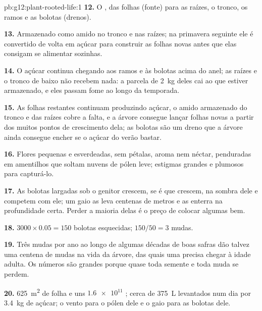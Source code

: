 \begin{solution}{pb:g12:plant-rooted-life:1}
\textbf{12.} O , das folhas (fonte) para as raízes, o tronco, os
ramos e as bolotas (drenos).

\textbf{13.} Armazenado como amido no tronco e nas raízes; na primavera
seguinte ele é convertido de volta em açúcar para construir as folhas
novas antes que elas consigam se alimentar sozinhas.

\textbf{14.} O açúcar continua chegando aos ramos e às bolotas acima do
anel; as raízes e o tronco de baixo não recebem nada: a parcela de
\qty{2}{kg} deles cai ao que estiver armazenado, e eles passam fome ao
longo da temporada.

\textbf{15.} As folhas restantes continuam produzindo açúcar, o amido
armazenado do tronco e das raízes cobre a falta, e a árvore consegue
lançar folhas novas a partir dos muitos pontos de crescimento dela; as
bolotas são um dreno que a árvore ainda consegue encher se o açúcar do
verão bastar.

\textbf{16.} Flores pequenas e esverdeadas, sem pétalas, aroma nem
néctar, penduradas em amentilhos que soltam nuvens de pólen leve;
estigmas grandes e plumosos para capturá-lo.

\textbf{17.} As bolotas largadas sob o genitor crescem, se é que
crescem, na sombra dele e competem com ele; um gaio as leva centenas de
metros e as enterra na profundidade certa. Perder a maioria delas é o
preço de colocar algumas bem.

\textbf{18.} $3000 \times 0.05 = 150$ bolotas esquecidas; $150/50 = 3$
mudas.

\textbf{19.} Três mudas por ano ao longo de algumas décadas de boas
safras dão talvez uma centena de mudas na vida da árvore, das quais uma
precisa chegar à idade adulta. Os números são grandes porque quase toda
semente e toda muda se perdem.

\textbf{20.} \qty{625}{m^2} de folha e uns $\num{1.6e11}$ ;
cerca de \qty{375}{L} levantados num dia por \qty{3.4}{kg} de açúcar; o
vento para o pólen dele e o gaio para as bolotas dele.
\end{solution}
